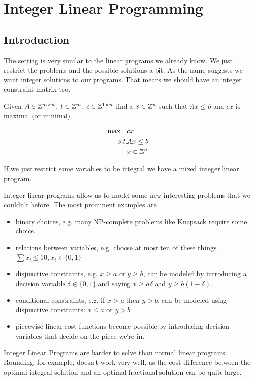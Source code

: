 \chapter{Integer Linear Programming}
\section{Introduction}

The setting is very similar to the linear programs we already know. We just restrict the problems and the possible solutions a bit. As the name suggests we want integer solutions to our programs. That means we should have an integer constraint matrix too. 

\begin{Def} Given $A\in \mathbb{Z}^{m\times n}$, $b\in \mathbb{Z}^m$, $c\in \mathbb{Z}^{1\times n}$ find a $x\in \mathbb{Z}^n$ such that $Ax\leq b$ and $cx$ is maximal (or minimal)

\begin{align*}
\max \quad & cx \\
s.t. & Ax \leq b\\
&x\in \mathbb{Z}^n
\end{align*}
\end{Def}

If we just restrict some variables to be integral we have a mixed integer linear program.

Integer linear programs allow us to model some new interesting problems that we couldn't before. The most prominent examples are 

\begin{itemize}
\item binary choices, e.g. many NP-complete problems like Knapsack require some choice. 
\item relations between variables, e.g. choose at most ten of these things $\sum x_i \leq 10, x_i\in \{0,1\}$
\item disjunctive constraints, e.g. $x\geq a$ or $y\geq b$, can be modeled by introducing a decision variable $\delta \in \{0,1\}$ and saying $x\geq a\delta$ and $y \geq b(1-\delta)$. 
\item conditional constraints, e.g. if $x>a$ then $y>b$, can be modeled using disjunctive constraints: $x\leq a$ or $y>b$
\item piecewise linear cost functions become possible by introducing decision variables that decide on the piece we're in.
\end{itemize}

Integer Linear Programs are harder to solve than normal linear programs. Rounding, for example, doesn't work very well, as the cost difference between the optimal integral solution and an optimal fractional solution can be quite large.

